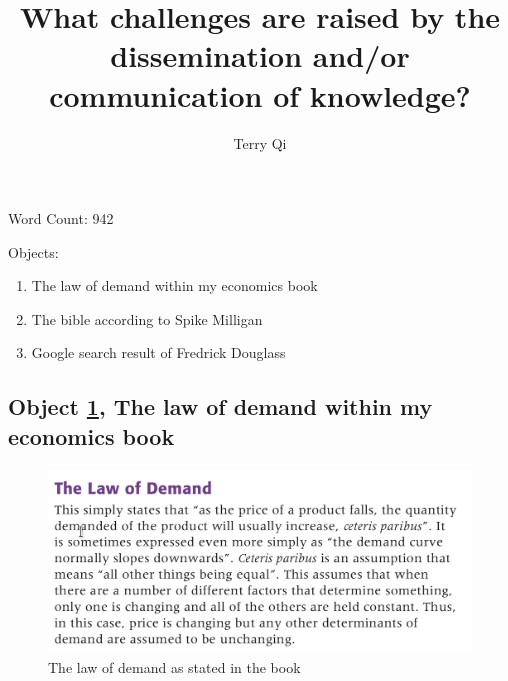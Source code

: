 \documentclass[a4paper,11pt]{article}
\title{What challenges are raised by the dissemination and/or communication of knowledge?}
\author{Terry Qi}
\begin{document}
\maketitle

Word Count: 942

Objects:
\begin{enumerate}
 \item The law of demand within my economics book
 \item The bible according to Spike Milligan
 \item Google search result of Fredrick Douglass
\end{enumerate}

\newpage




\subsection*{Object \ref{fig:lod}, The law of demand within my economics book}

\begin{figure}[H]
 \centering
 \includegraphics[scale=0.3]{ecobook.png}
 \caption{The law of demand as stated in the book \parencite{blink_dorton_2012}}
 \label{fig:lod}
\end{figure}
\end{document}
